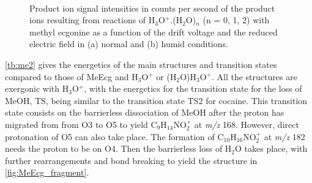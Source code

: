 \begin{figure}[htbp]
\centering
{}\\
\caption{Product ion signal intensities in counts per second of the product ions resulting from reactions of H$_3$O$^+$.(H$_2$O)$_n$ (n = 0, 1, 2) with methyl ecgonine as a function of the drift voltage and the reduced electric field in (a) normal and (b) humid conditions.}
\label{fig:MeEcgEN}
\end{figure}



\autoref{tb:me2} gives the energetics of the main structures and transition states compared to those of MeEcg and H$_3$O$^+$ or (H$_2$O)H$_3$O$^+$.
%
All the structures are exergonic with H$_3$O$^+$, with the energetics for the transition state for the loss of MeOH, TS, being  similar to the transition state TS2 for cocaine.
%
This transition state consists on the barrierless dissociation of MeOH after the proton has migrated from from O3 to O5 to yield C$_9$H$_{14}$NO$_2^+$ at \textit{m/z} 168. However, direct protonation of O5 can also take place. 
%
The formation of C$_{10}$H$_{16}$NO$_2^+$ at \textit{m/z} 182  needs the proton to be on O4.
%
Then the barrierless loss of H$_2$O takes place, with further rearrangements and bond breaking to yield the structure in \autoref{fig:MeEcg_fragment}.

